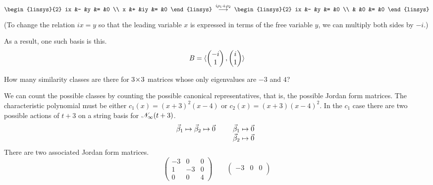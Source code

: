 \begin{exercises}
\begin{answer}
\begin{equation*}
\begin{linsys}{2}
           ix  &-  &y  &=  &0  \\
            x  &+  &iy &=  &0
         \end{linsys}
         \;\grstep{i\rho_1+\rho_2}\;
         \begin{linsys}{2}
           ix  &-  &y  &=  &0  \\
               &   &0  &=  &0
         \end{linsys}
       \end{equation*}
       (To change the relation $ix=y$ so that the leading variable $x$ is
       expressed in terms of the free variable $y$, we can multiply both
       sides by $-i$.)

       As a result, one such basis is this.
       \begin{equation*}
         B=\langle\begin{pmatrix} -i \\ 1 \end{pmatrix},
                     \begin{pmatrix} i \\ 1 \end{pmatrix}\rangle
       \end{equation*}  
     \end{answer}
  \item 
    How many similarity classes are there for \( 3 \! \times \! 3 \) matrices
    whose only eigenvalues are \( -3 \) and \( 4 \)?
    \begin{answer}
     We can count the possible classes by counting the possible
     canonical representatives, that is, the possible Jordan form matrices.
     The characteristic polynomial must be either $c_1(x)=(x+3)^2(x-4)$
     or $c_2(x)=(x+3)(x-4)^2$.
     In the $c_1$ case there are two possible actions 
     of $t+3$ on a string basis for $\mathscr{N}_\infty(t+3)$.
     \begin{equation*}
       \vec{\beta}_1\mapsto\vec{\beta}_2\mapsto \vec{0}
       \qquad
       \begin{array}[t]{l}
         \vec{\beta}_1\mapsto\vec{0} \\
         \vec{\beta}_2\mapsto\vec{0} 
       \end{array}
     \end{equation*}
     There are two associated Jordan form matrices.
     \begin{equation*}
        \begin{pmatrix}
          -3  &0  &0  \\
           1  &-3 &0  \\
           0  &0  &4
        \end{pmatrix}
        \qquad
        \begin{pmatrix}
          -3  &0  &0  \\

\end{pmatrix}
\end{equation*}
\end{answer}
\end{exercises}
